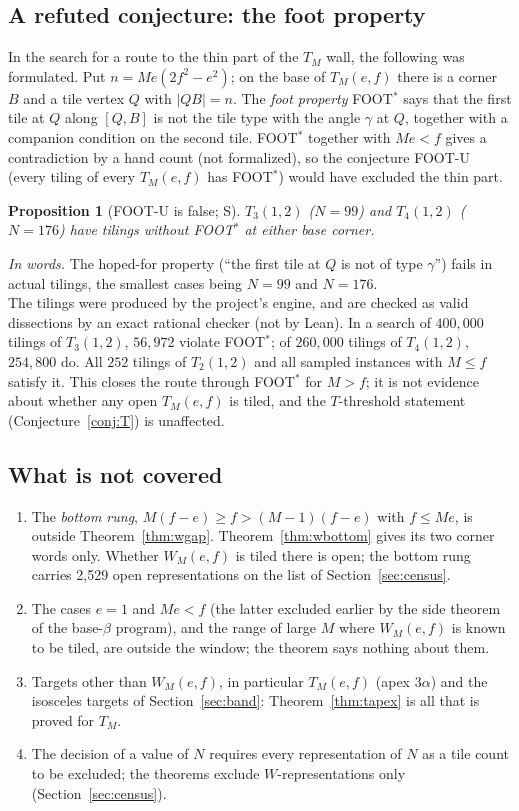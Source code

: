 \documentclass[11pt,reqno]{amsart}
\theoremstyle{plain}
\newtheorem{proposition}[theorem]{Proposition}
\theoremstyle{definition}
\newcommand{\sS}{\textup{\textsf{S}}}
\begin{document}
\subsection{A refuted conjecture: the foot property}\label{sub:wgap:foot}
In the search for a route to the thin part of the $T_M$ wall, the following was formulated. Put $n=Me(2f^2-e^2)$; on the
base of $T_M(e,f)$ there is a corner $B$ and a tile vertex $Q$ with $|QB|=n$. The \emph{foot property} FOOT$^\ast$ says that
the first tile at $Q$ along $[Q,B]$ is not the tile type with the angle $\gamma$ at $Q$, together with a companion
condition on the second tile. FOOT$^\ast$ together with $Me<f$ gives a contradiction by a hand count (not formalized), so the
conjecture FOOT-U (every tiling of every $T_M(e,f)$ has FOOT$^\ast$) would have excluded the thin part.

\begin{proposition}[FOOT-U is false; \sS]\label{prop:foot}
$T_3(1,2)$ ($N=99$) and $T_4(1,2)$ ($N=176$) have tilings without FOOT$^\ast$ at either base corner.
\end{proposition}
\noindent\emph{In words.} The hoped-for property (``the first tile at $Q$ is not of type $\gamma$'') fails in actual
tilings, the smallest cases being $N=99$ and $N=176$.\\
\noindent The tilings were produced by the project's engine, and are checked as valid dissections by an exact rational
checker (not by Lean). In a search of $400{,}000$ tilings of $T_3(1,2)$, $56{,}972$ violate FOOT$^\ast$; of $260{,}000$ tilings of
$T_4(1,2)$, $254{,}800$ do. All $252$ tilings of $T_2(1,2)$ and all sampled instances with $M\le f$ satisfy it. This
closes the route through FOOT$^\ast$ for $M>f$; it is not evidence about whether any open $T_M(e,f)$ is tiled, and the $T$-threshold
statement (Conjecture~\ref{conj:T}) is unaffected.

\subsection{What is not covered}\label{sub:wgap:limits}
\begin{enumerate}
\item The \emph{bottom rung}, $M(f-e)\ge f>(M-1)(f-e)$ with $f\le Me$, is outside Theorem~\ref{thm:wgap}. Theorem~\ref{thm:wbottom}
 gives its two corner words only. Whether $W_M(e,f)$ is tiled there is open; the bottom rung carries 2,529 open
 representations on the list of Section~\ref{sec:census}.
\item The cases $e=1$ and $Me<f$ (the latter excluded earlier by the side theorem of the base-$\beta$ program),
 and the range of large $M$ where $W_M(e,f)$ is known to be tiled, are outside the window; the theorem says
 nothing about them.
\item Targets other than $W_M(e,f)$, in particular $T_M(e,f)$ (apex $3\alpha$) and the isosceles targets of
 Section~\ref{sec:band}: Theorem~\ref{thm:tapex} is all that is proved for $T_M$.
\item The decision of a value of $N$ requires every representation of $N$ as a tile count to be excluded; the
 theorems exclude $W$-representations only (Section~\ref{sec:census}).
\end{enumerate}
\end{document}
